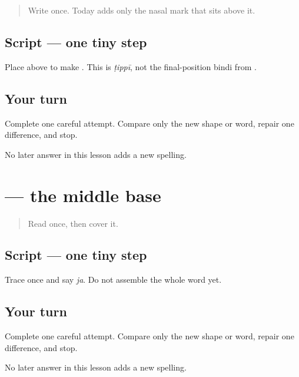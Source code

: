\begin{quote}
Write \textbf{} once. Today adds only the nasal mark that sits above it.
\end{quote}

\subsection*{Script — one tiny step}
Place \textbf{} above \textbf{} to make \textbf{}. This is \emph{ṭippī}, not the final-position bindi from \textbf{}.

\subsection*{Your turn}
Complete one careful attempt. Compare only the new shape or word, repair one difference, and stop.

\begin{tcolorbox}[breakable,colback=teal!4,colframe=teal!35!black,title={Before you move on}]
No later answer in this lesson adds a new spelling.
\end{tcolorbox}
\section[\texorpdfstring{\pa{ਜ} (ja)}{ਜ (ja)}]{ — the middle base}

\label{lesson:PA-W03-ja}



\begin{quote}
Read \textbf{} once, then cover it.
\end{quote}

\subsection*{Script — one tiny step}

Trace \textbf{} once and say \emph{ja}. Do not assemble the whole word yet.

\subsection*{Your turn}
Complete one careful attempt. Compare only the new shape or word, repair one difference, and stop.

\begin{tcolorbox}[breakable,colback=teal!4,colframe=teal!35!black,title={Before you move on}]
No later answer in this lesson adds a new spelling.
\end{tcolorbox}
